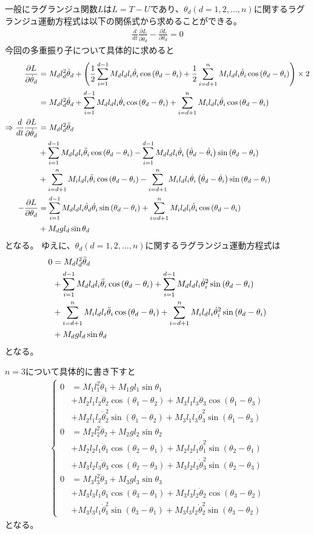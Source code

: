 \documentclass{jsarticle}
\newcommand{\eqa}[1]{\begin{align}#1\end{align}}
\newcommand{\so}{\Rightarrow}
\newcommand{\cost}[2]{\cos\left(\theta_{#1}-\theta_{#2}\right)}
\newcommand{\sint}[2]{\sin\left(\theta_{#1}-\theta_{#2}\right)}
\newcommand{\dott}[1]{\dot{\theta}_{#1}}
\newcommand{\ddott}[1]{\ddot{\theta}_{#1}}
\begin{document}
一般にラグランジュ関数$L$は$L = T - U$であり、$\theta_d(d=1,2,\dots,n)$に関するラグランジュ運動方程式は以下の関係式から求めることができる。
\eqa{
	\frac{d}{dt} \frac{\partial L}{\partial \dott{d}} - \frac{\partial L}{\partial \theta_d} = 0
}
今回の多重振り子について具体的に求めると
\eqa{
	\frac{\partial L}{\partial \dott{d}} &=
		M_d l_d^2 \dott{d}
		+ \left(\frac{1}{2}\sum_{i=1}^{d-1} M_d l_d l_i \dott{i} \cost{d}{i} + \frac{1}{2}\sum_{i=d+1}^n M_i l_d l_i \dott{i} \cost{d}{i} \right) \times 2 \notag\\
		&= M_d l_d^2 \dott{d} + \sum_{i=1}^{d-1} M_d l_d l_i \dott{i} \cost{d}{i} +\sum_{i=d+1}^n M_i l_d l_i \dott{i} \cost{d}{i} \\
	\so \frac{d}{dt} \frac{\partial L}{\partial \dott{d}} &=
		M_d l_d^2 \ddott{d} \notag\\
		&+ \sum_{i=1}^{d-1} M_d l_d l_i \ddott{i} \cost{d}{i}
			- \sum_{i=1}^{d-1} M_d l_d l_i \dott{i} \left( \dott{d} - \dott{i} \right) \sint{d}{i} \notag\\
		&+ \sum_{i=d+1}^n M_i l_d l_i \ddott{i} \cost{d}{i}
			- \sum_{i=d+1}^n M_i l_d l_i \dott{i} \left( \dott{d} - \dott{i} \right) \sint{d}{i} \notag\\
	- \frac{\partial L}{\partial \theta_d} &=
		\sum_{i=1}^{d-1} M_d l_d l_i \dott{d} \dott{i} \sint{d}{i} + \sum_{i=d+1}^n M_i l_d l_i \dott{i} \cost{d}{i} \notag\\
		&+ M_d g l_d \sin\theta_d
}
となる。
ゆえに、$\theta_d(d=1,2,\dots,n)$に関するラグランジュ運動方程式は
\eqa{
	0 &= M_d l_d^2 \ddott{d} \notag\\
		&+ \sum_{i=1}^{d-1} M_d l_d l_i \ddott{i} \cost{d}{i}
			+ \sum_{i=1}^{d-1} M_d l_d l_i \dott{i}^2 \sint{d}{i} \notag\\
		&+ \sum_{i=d+1}^n M_i l_d l_i \ddott{i} \cost{d}{i}
			+ \sum_{i=d+1}^n M_i l_d l_i \dott{i}^2 \sint{d}{i} \notag\\
		&+ M_d g l_d \sin\theta_d
		\label{2Dラグランジュ運動方程式}
}
となる。

$n=3$について具体的に書き下すと
\eqa{
	\begin{cases}
		0 &= M_1 l_1^2 \ddott{1} + M_1 g l_1 \sin\theta_1 \\
			&+ M_2 l_1 l_2 \ddott{2} \cost{1}{2} + M_3 l_1 l_3 \ddott{3} \cost{1}{3} \\
			&+ M_2 l_1 l_2 \dott{2}^2 \sint{1}{2} + M_3 l_1 l_3 \dott{3}^2 \sint{1}{3} \\
		0 &= M_2 l_2^2 \ddott{2}  + M_2 g l_2 \sin\theta_2 \\
			&+ M_2 l_2 l_1 \ddott{1} \cost{2}{1} + M_2 l_2 l_1 \dott{1}^2 \sint{2}{1} \\
			&+ M_3 l_2 l_3 \ddott{3} \cost{2}{3} + M_3 l_2 l_3 \dott{3}^2 \sint{2}{3} \\
		0 &= M_3 l_3^2 \ddott{3}  + M_3 g l_3 \sin\theta_3 \\
			&+ M_3 l_3 l_1 \ddott{1} \cost{3}{1} + M_3 l_3 l_2 \ddott{2} \cost{3}{2} \\
			&+ M_3 l_3 l_1 \dott{1}^2 \sint{3}{1} + M_3 l_3 l_2 \dott{2}^2 \sint{3}{2}
	\end{cases}
}
となる。
\end{document}
